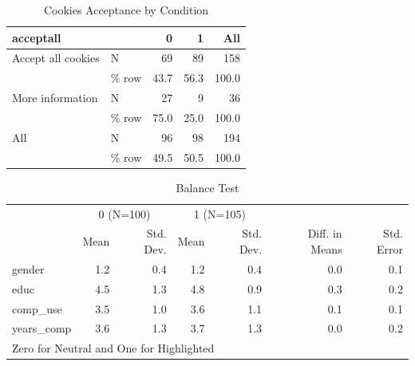 \documentclass[
  11pt,
  letterpaper,
]{article}
\begin{document}
\begin{table}

\caption{\label{tab:crosstab1}Cookies Acceptance by Condition}
\centering
\begin{tabular}[t]{llrrr}
\toprule
acceptall &   & 0 & 1 & All\\
\midrule
Accept all cookies & N & 69 & 89 & 158\\
 & \% row & \num{43.7} & \num{56.3} & \num{100.0}\\
More information & N & 27 & 9 & 36\\
 & \% row & \num{75.0} & \num{25.0} & \num{100.0}\\
All & N & 96 & 98 & 194\\
 & \% row & \num{49.5} & \num{50.5} & \num{100.0}\\
\bottomrule
\end{tabular}
\end{table}

\begin{table}

\caption{\label{tab:balancetab}Balance Test}
\centering
\begin{tabular}[t]{lrrrrrr}
\toprule
\multicolumn{1}{c}{ } & \multicolumn{2}{c}{0 (N=100)} & \multicolumn{2}{c}{1 (N=105)} & \multicolumn{2}{c}{ } \\
\cmidrule(l{3pt}r{3pt}){2-3} \cmidrule(l{3pt}r{3pt}){4-5}
  & Mean & Std. Dev. & Mean  & Std. Dev.  & Diff. in Means & Std. Error\\
\midrule
gender & 1.2 & 0.4 & 1.2 & 0.4 & 0.0 & 0.1\\
educ & 4.5 & 1.3 & 4.8 & 0.9 & 0.3 & 0.2\\
comp\_use & 3.5 & 1.0 & 3.6 & 1.1 & 0.1 & 0.1\\
years\_comp & 3.6 & 1.3 & 3.7 & 1.3 & 0.0 & 0.2\\
\bottomrule
\multicolumn{7}{l}{\rule{0pt}{1em}Zero for Neutral and One for Highlighted}\\
\end{tabular}
\end{table}
\end{document}
